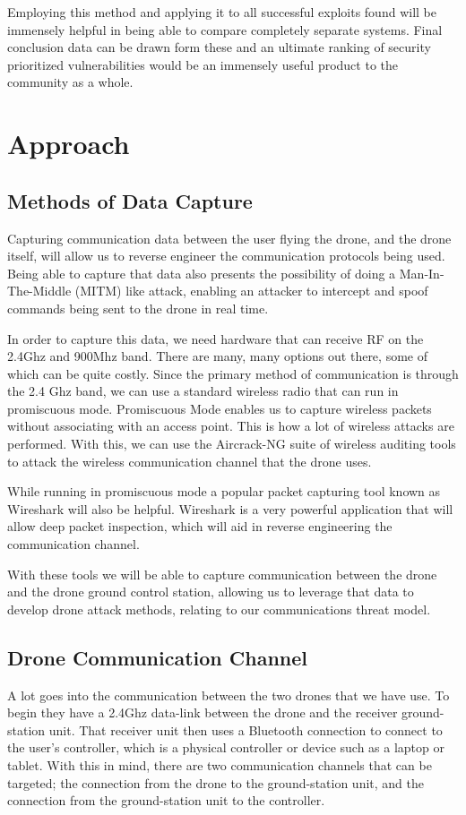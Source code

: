 \documentclass[IEEEtran,letterpaper,10pt,notitlepage,draftclsnofoot,onecolumn]{article}
\begin{document}
Employing this method and applying it to all successful exploits found will be immensely helpful in being able to compare completely separate systems.
Final conclusion data can be drawn form these and an ultimate ranking of security prioritized vulnerabilities would be an immensely useful product to the community as a whole. 

\section{Approach}
\subsection{Methods of Data Capture}
Capturing communication data between the user flying the drone, and the drone itself, will allow us to reverse engineer
the communication protocols being used. Being able to capture that data also presents the possibility of doing a
Man-In-The-Middle (MITM) like attack, enabling an attacker to intercept and spoof commands being sent to the drone
in real time.

In order to capture this data, we need hardware that can receive RF on the 2.4Ghz and 900Mhz band. There are many, many
options out there, some of which can be quite costly. Since the primary method of communication is through the 2.4 Ghz
band, we can use a standard wireless radio that can run in promiscuous mode\cite{WiFiPerc}. Promiscuous Mode enables
us to capture wireless packets without associating with an access point. This is how a lot of wireless attacks are
performed\cite{WiFiPerc}. With this, we can use the Aircrack-NG suite of wireless auditing tools to attack the wireless
communication channel that the drone uses\cite{AircrackNG}.

While running in promiscuous mode a popular packet capturing tool known as Wireshark will also be helpful. Wireshark
is a very powerful application that will allow deep packet inspection, which will aid in reverse engineering the
communication channel\cite{WiFiPerc}.

With these tools we will be able to capture communication between the drone and the drone ground control station, allowing
us to leverage that data to develop drone attack methods, relating to our communications threat model.


\subsection{Drone Communication Channel}
A lot goes into the communication between the two drones that we have use.
To begin they have a 2.4Ghz data-link between the drone and the receiver ground-station unit.
That receiver unit then uses a Bluetooth connection to connect to the user's controller, which is a physical controller
or device such as a laptop or tablet.\cite{NazaM2} With this in mind, there are two communication channels that can be
targeted; the connection from the drone to the ground-station unit, and the connection from the ground-station unit
to the controller\cite{NazaM2}.
\end{document}
